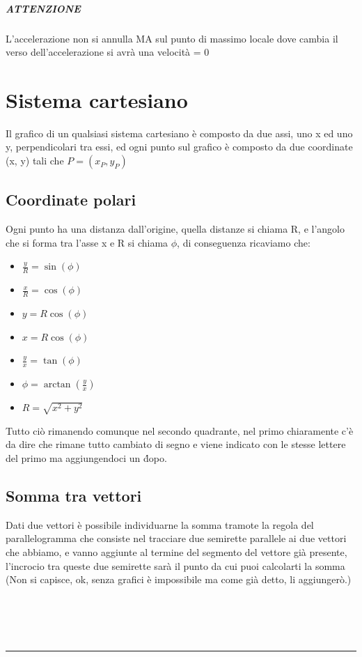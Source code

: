 \documentclass[12pt, a4paper, openany, oneside]{book}
\begin{document}
\paragraph{ATTENZIONE} L'accelerazione non si annulla MA sul punto di massimo
locale dove cambia il verso dell'accelerazione si avrà una velocità = 0
\chapter{Sistema cartesiano}
Il grafico di un qualsiasi sistema cartesiano è composto da due assi, uno x ed
uno y, perpendicolari tra essi, ed ogni punto sul grafico è composto da due
coordinate (x, y) tali che $P = (x_{P}, y_{P})$
\section{Coordinate polari} 
Ogni punto ha una distanza dall'origine, quella distanze si chiama R, e l'angolo
che si forma tra l'asse x e R si chiama $\phi$, di conseguenza ricaviamo che:
\begin{itemize}
	\item $\frac{y}{R} = \sin(\phi)$
	\item $\frac{x}{R} = \cos(\phi)$
	\item $y = R \cos(\phi)$
	\item $x = R \cos(\phi)$
	\item $\frac{y}{x} = \tan(\phi)$
	\item $\phi = \arctan(\frac{y}{x})$
	\item $R = \sqrt{x^{2}+y^{2}}$
\end{itemize}
Tutto ciò rimanendo comunque nel secondo quadrante, nel primo chiaramente c'è
da dire che rimane tutto cambiato di segno e viene indicato con le stesse lettere
del primo ma aggiungendoci un \' dopo.
\section{Somma tra vettori}
Dati due vettori è possibile individuarne la somma tramote la regola del 
parallelogramma che consiste nel tracciare due semirette parallele ai due 
vettori che abbiamo, e vanno aggiunte al termine del segmento del vettore
già presente, l'incrocio tra queste due semirette sarà il punto da cui puoi
calcolarti la somma (Non si capisce, ok, senza grafici è impossibile ma 
come già detto, li aggiungerò.) \\ \\ \\ \\
\\
{\color{black} \rule{\linewidth}{0.3mm} }
\end{document}
